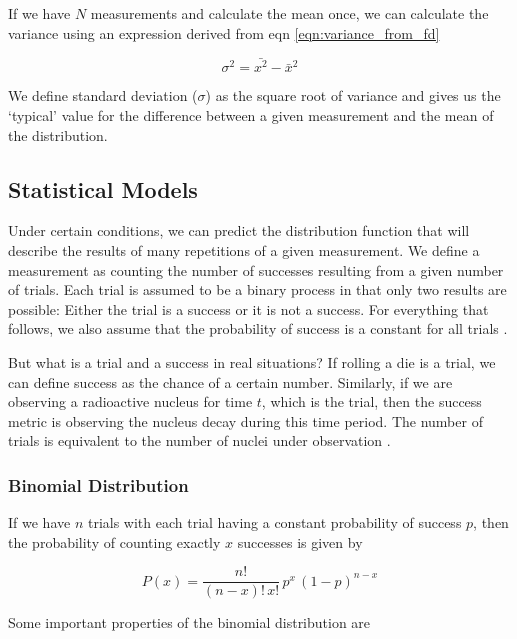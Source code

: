 \documentclass{article}
\begin{document}
If we have $N$ measurements and calculate the mean once, we can calculate the variance using an expression derived from eqn \ref{eqn:variance_from_fd} \cite{Knoll2000}

\[\sigma^2 = \bar{x^2} - \bar{x}^2\]

We define standard deviation ($\sigma$) as the square root of variance and gives us the `typical' value for the difference between a given measurement and the mean of the distribution.

\subsection{Statistical Models}

Under certain conditions, we can predict the distribution function that will describe the results of many repetitions of a given measurement.
We define a measurement as counting the number of successes resulting from a given number of trials. Each trial is assumed to be a binary process in that only two results are possible: Either the trial is a success or it is not
a success. For everything that follows, we also assume that the probability of success is a constant for all trials \cite{Knoll2000}.

But what is a trial and a success in real situations? If rolling a die is a trial, we can define success as the chance of a certain number. Similarly,
if we are observing a radioactive nucleus for time $t$, which is the trial, then the success metric is observing the nucleus decay during this time period.
The number of trials is equivalent to the number of nuclei under observation \cite{Knoll2000}. 


\subsubsection{Binomial Distribution}


If we have $n$ trials with each trial having a constant probability of success $p$, then the probability of counting exactly $x$ successes is given by 

\begin{equation}\label{eqn:binomial_distri}
    P(x) = \frac{n !}{(n-x)! \, x!} \, p^x \, (1-p)^{n-x}
\end{equation}

Some important properties of the binomial distribution are
\end{document}
